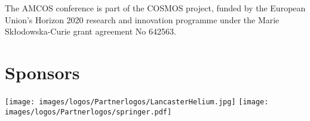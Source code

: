 \begin{center}
The AMCOS conference is part of the COSMOS project, funded by the European Union’s Horizon 2020 research and innovation programme under the Marie Sk\l{}odowska-Curie grant agreement No 642563.
\end{center}

\vfill

\section{Sponsors}

\begin{center}
\texttt{[image: images/logos/Partnerlogos/LancasterHelium.jpg]}
\texttt{[image: images/logos/Partnerlogos/springer.pdf]}
\end{center}

\vfill